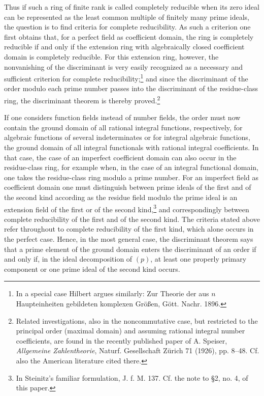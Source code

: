 \documentclass[11pt]{article}
\begin{document}
Thus if such a ring of finite rank is called completely reducible when its zero ideal can be represented as the least common multiple of finitely many prime ideals, the question is to find criteria for complete reducibility. As such a criterion one first obtains that, for a perfect field as coefficient domain, the ring is completely reducible if and only if the extension ring with algebraically closed coefficient domain is completely reducible. For this extension ring, however, the nonvanishing of the discriminant is very easily recognized as a necessary and sufficient criterion for complete reducibility;\footnote{In a special case Hilbert argues similarly: Zur Theorie der aus $n$ Haupteinheiten gebildeten komplexen Größen, Gött. Nachr. 1896.} and since the discriminant of the order modulo each prime number passes into the discriminant of the residue-class ring, the discriminant theorem is thereby proved.\footnote{Related investigations, also in the noncommutative case, but restricted to the principal order (maximal domain) and assuming rational integral number coefficients, are found in the recently published paper of A. Speiser, \emph{Allgemeine Zahlentheorie}, Naturf. Gesellschaft Zürich 71 (1926), pp. 8--48. Cf. also the American literature cited there.}

If one considers function fields instead of number fields, the order must now contain the ground domain of all rational integral functions, respectively, for algebraic functions of several indeterminates or for integral algebraic functions, the ground domain of all integral functionals with rational integral coefficients. In that case, the case of an imperfect coefficient domain can also occur in the residue-class ring, for example when, in the case of an integral functional domain, one takes the residue-class ring modulo a prime number. For an imperfect field as coefficient domain one must distinguish between prime ideals of the first and of the second kind according as the residue field modulo the prime ideal is an extension field of the first or of the second kind,\footnote{In Steinitz's familiar formulation, J. f. M. 137. Cf. the note to \S 2, no. 4, of this paper.} and correspondingly between complete reducibility of the first and of the second kind. The criteria stated above refer throughout to complete reducibility of the first kind, which alone occurs in the perfect case. Hence, in the most general case, the discriminant theorem says that a prime element of the ground domain enters the discriminant of an order if and only if, in the ideal decomposition of $(p)$, at least one properly primary component or one prime ideal of the second kind occurs.
\end{document}
